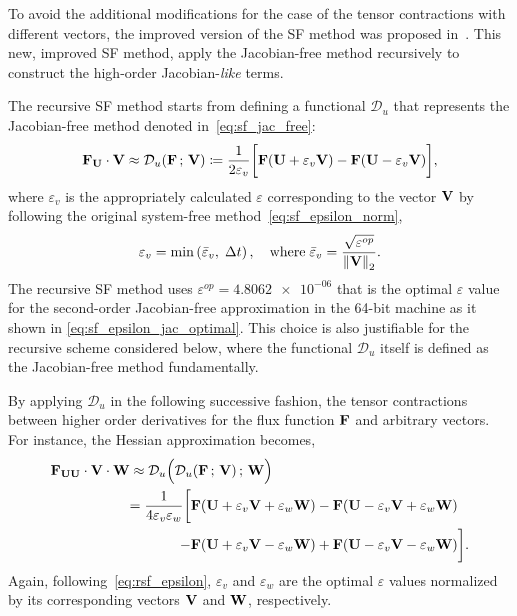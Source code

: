 To avoid the additional modifications for the case of the tensor contractions with different vectors,
the improved version of the SF method was proposed in~\cite{lee2021recursive}.
This new, improved SF method, apply the Jacobian-free method recursively to construct the high-order Jacobian-\textit{like} terms.

The recursive SF method starts from defining a functional \( \mathcal{D}_{u} \)
that represents the Jacobian-free method denoted in~\cref{eq:sf_jac_free}:
\begin{equation}\label{eq:rsf_functional}
    \mathbf{F}_{\mathbf{U}} \cdot \mathbf{V} \approx \mathcal{D}_{u} (\mathbf{F} \,;\, \mathbf{V}) \coloneqq
    \frac{1}{2\varepsilon_{v}} \bigg[
        \mathbf{F}(\mathbf{U} + \varepsilon_{v} \mathbf{V}) - \mathbf{F}(\mathbf{U} - \varepsilon_{v} \mathbf{V})
    \bigg],
\end{equation}
where \( \varepsilon_{v} \) is the appropriately calculated \( \varepsilon \)
corresponding to the vector \( \mathbf{V} \)
by following the original system-free method~\cref{eq:sf_epsilon_norm},
\begin{equation}\label{eq:rsf_epsilon}
    \varepsilon_{v} = \min \left(\bar{\varepsilon}_{v}, \; \Delta t \right), \quad \text{where} \;
    \bar{\varepsilon}_{v} = \frac{\sqrt{\varepsilon^{op}}}{\left\lVert \mathbf{V} \right\rVert_{2}}.
\end{equation}
The recursive SF method uses \( \varepsilon^{op} = \num{4.8062e-06} \)
that is the optimal \( \varepsilon \) value
for the second-order Jacobian-free approximation in the 64-bit machine
as it shown in \cref{eq:sf_epsilon_jac_optimal}.
This choice is also justifiable for the recursive scheme considered below,
where the functional \( \mathcal{D}_{u} \) itself is defined as the Jacobian-free method fundamentally.

By applying \( \mathcal{D}_{u} \) in the following successive fashion,
the tensor contractions between higher order derivatives for
the flux function \( \mathbf{F} \) and arbitrary vectors.
For instance, the Hessian approximation becomes,
\begin{equation}\label{eq:rsf_hes_free}
    \begin{split}
        \mathbf{F}_{\mathbf{U} \mathbf{U}} \cdot \mathbf{V} \cdot \mathbf{W} &\approx
        \mathcal{D}_{u} \Big( \mathcal{D}_{u} (\mathbf{F} \,;\, \mathbf{V}) \,;\, \mathbf{W} \Big) \\
        &
        \begin{split}
            =\frac{1}{4 \varepsilon_{v} \varepsilon_{w}}
                \bigg[
                     &\mathbf{F}(\mathbf{U} + \varepsilon_{v} \mathbf{V} + \varepsilon_{w} \mathbf{W})
                    -\mathbf{F}(\mathbf{U} - \varepsilon_{v} \mathbf{V} + \varepsilon_{w} \mathbf{W})\\
                    -&\mathbf{F}(\mathbf{U} + \varepsilon_{v} \mathbf{V} - \varepsilon_{w} \mathbf{W})
                    +\mathbf{F}(\mathbf{U} - \varepsilon_{v} \mathbf{V} - \varepsilon_{w} \mathbf{W})
                \bigg].
        \end{split}
    \end{split}
\end{equation}
Again, following~\cref{eq:rsf_epsilon},
\( \varepsilon_{v} \) and \( \varepsilon_{w} \) are the optimal \( \varepsilon \) values
normalized by its corresponding vectors \( \mathbf{V} \) and \( \mathbf{W} \), respectively.


